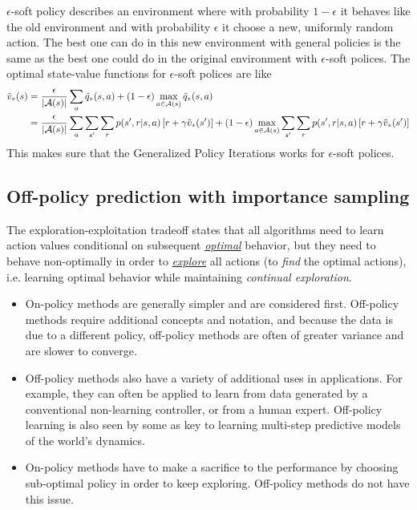 \documentclass[11pt]{article}
\begin{document}
$\epsilon$-soft policy describes an environment where with probability $1-\epsilon$ it behaves like the old environment and with probability $\epsilon$ it choose a new, uniformly random action. The best one can do in this new environment with general policies is the same as the best one could do in the original environment with $\epsilon$-soft polices. The optimal state-value  functions for $\epsilon$-soft polices are like
\begin{align*}
\tilde{v}_{*}(s) &=  \frac{\epsilon}{|{\mathcal A}(s)|}\sum_{a}\tilde{q}_{*}(s, a) + (1-\epsilon)\max_{a\in {\mathcal A}(s)}\tilde{q}_{*}(s, a) \\
&=\frac{\epsilon}{|{\mathcal A}(s)|}\sum_{a}\sum_{s'}\sum_{r}p(s', r|s, a)\left[r + \gamma \tilde{v}_{*}(s')\right]+ (1-\epsilon)\max_{a\in {\mathcal A}(s)}\sum_{s'}\sum_{r}p(s', r|s, a)\left[r + \gamma \tilde{v}_{*}(s')\right]
\end{align*} This makes sure that the Generalized Policy Iterations works for  $\epsilon$-soft polices.

\subsection{Off-policy prediction with importance sampling}
The exploration-exploitation tradeoff states that all algorithms need to learn action values conditional on subsequent \underline{\emph{optimal}} behavior, but they need to behave non-optimally in order to \underline{\emph{explore}} all actions (to \emph{find} the optimal actions), i.e. learning optimal behavior while maintaining \emph{continual exploration}. 

\begin{itemize}
\item On-policy methods are generally simpler and are considered first. Off-policy methods require additional concepts and notation, and because the data is due to a different policy, off-policy methods are often of greater variance and are slower to converge.

\item Off-policy methods also have a variety of additional uses in applications. For example, they can often be applied to learn from data generated by a conventional non-learning controller, or from a human expert. Off-policy learning is also seen by some as key to learning multi-step predictive models of the world’s dynamics. 

\item On-policy methods have to make a sacrifice to the performance by choosing sub-optimal policy in order to keep exploring. Off-policy methods do not have this issue. 
\end{itemize}
\end{document}
